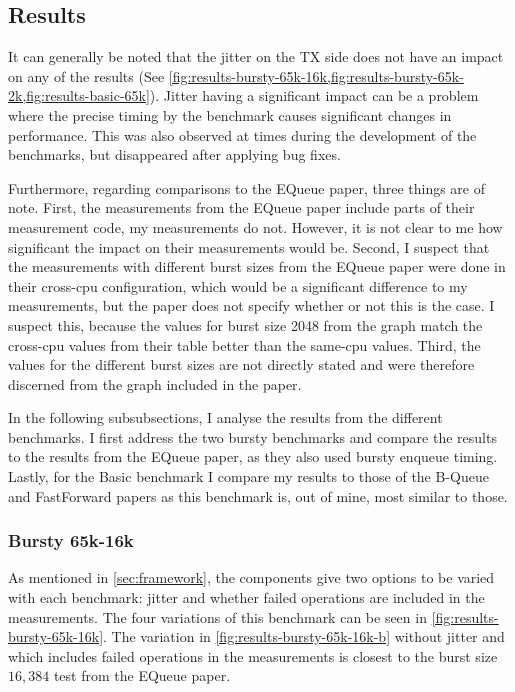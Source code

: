 \subsection{Results}
It can generally be noted that the jitter on the TX side does not have an impact on any of the results
(See \cref{fig:results-bursty-65k-16k,fig:results-bursty-65k-2k,fig:results-basic-65k}).
Jitter having a significant impact can be a problem where the precise timing by the benchmark causes
significant changes in performance.
This was also observed at times during the development of the benchmarks, but disappeared after applying bug fixes.

Furthermore, regarding comparisons to the EQueue paper, three things are of note.
First, the measurements from the EQueue paper include parts of their measurement code, my measurements do not\cite{EQueueGithub}.
However, it is not clear to me how significant the impact on their measurements would be.
Second, I suspect that the measurements with different burst sizes from the EQueue paper were done in their
cross-cpu configuration,
which would be a significant difference to my measurements, but the paper does not specify whether or not
this is the case.
I suspect this, because the values for burst size 2048 from the graph match the cross-cpu values from their
table better than the same-cpu values.
Third, the values for the different burst sizes are not directly stated and were therefore discerned from the
graph included in the paper.

In the following subsubsections, I analyse the results from the different benchmarks.
I first address the two bursty benchmarks and compare the results to the results from the EQueue paper, as
they also used bursty enqueue timing.
Lastly, for the Basic benchmark I compare my results to those of the B-Queue and FastForward papers as this
benchmark is, out of mine, most similar to those.






\subsubsection{Bursty 65k-16k}
As mentioned in \autoref{sec:framework}, the components give two options to be varied with each benchmark:
jitter and whether failed operations are included in the measurements.
The four variations of this benchmark can be seen in \autoref{fig:results-bursty-65k-16k}.
The variation in \autoref{fig:results-bursty-65k-16k-b} without jitter and which includes failed operations
in the measurements is closest to the burst size $16,384$ test from the EQueue paper\cite{EQueue}.


